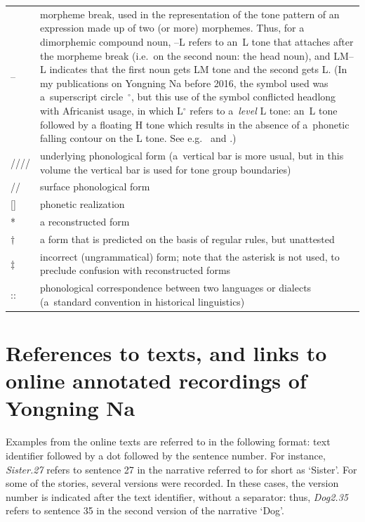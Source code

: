 \begin{table}[H]
{\renewcommand{\arraystretch}{1.35}
\begin{tabularx}{\textwidth}{ @{}l Q } 
-- & \parbox[t]{\linewidth}{morpheme break, used in the representation of the tone pattern of an expression made up of two (or more) morphemes. Thus, for a dimorphemic compound noun, --L refers to an~L tone that attaches after the morpheme break (i.e.\ on the second noun: the head noun), and LM--L indicates that the first noun gets LM tone and the second gets L. (In my publications on Yongning Na before 2016, the symbol used was a~superscript circle~$^{\circ}$, but this use of the symbol conflicted headlong with Africanist usage, in which L$^{\circ}$ refers to a~\textit{level} L tone: an~L tone followed by a floating H tone which results in the absence of a~phonetic falling contour on the L tone. See e.g.\ \citealt[84]{hyman1993} and \citealt[4]{akumbu2016featural}.)}\\
//// & \parbox[t]{\linewidth}{underlying phonological form (a~vertical bar is more usual, but in this volume the vertical bar is used for tone group boundaries)}\\
// & surface phonological form\\
{[]} & phonetic realization\\
* & a reconstructed form\\
$\dagger${\kern2pt} & a form that is predicted on the basis of regular rules, but unattested\\
$\ddagger${\kern2pt} & \parbox[t]{\linewidth}{incorrect (ungrammatical) form; note that the asterisk is not used, to preclude confusion with reconstructed forms}\\
:: & \parbox[t]{\linewidth}{phonological correspondence between two languages or dialects (a~standard convention in historical linguistics)}\\
\end{tabularx}}
\end{table}

\section*{References to texts, and links to online annotated recordings of Yongning Na}
\label{sec:refstotxts}

Examples from the online texts are referred to in the following
format: text identifier followed by a dot followed by the sentence
number. For instance, \textit{Sister.27} refers to sentence 27 in the
narrative referred to for short as ‘Sister'. For some of the stories, several versions were recorded. In these cases, the version number is indicated after the text identifier, without a separator: thus, \textit{Dog2.35} refers to sentence 35 in the second version of the narrative ‘Dog'.


